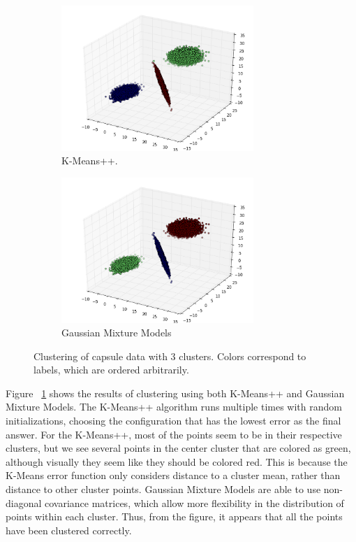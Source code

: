 \documentclass[11pt]{amsart}
\begin{document}
\begin{figure}
	\begin{subfigure}{\textwidth}
		\centering		
		\includegraphics[width=0.8\textwidth]{capsule_k_means_plot.png}
		\caption{K-Means++.}
	\end{subfigure}
	\begin{subfigure}{\textwidth}
		\centering
		\includegraphics[width=0.8\textwidth]{capsule_gauss_plot.png}
		\caption{Gaussian Mixture Models}
	\end{subfigure}
	\caption{Clustering of capsule data with 3 clusters. Colors correspond to labels, which are ordered arbitrarily.}
	\label{fig:clustering}
\end{figure}

Figure ~\ref{fig:clustering} shows the results of clustering using both K-Means++ and Gaussian Mixture Models. 
The K-Means++ algorithm runs multiple times with random initializations, choosing the configuration that has the lowest error as the final answer. For the K-Means++, most of the points seem to be in their respective clusters, but we see several points in the center cluster that are colored as green, although visually they seem like they should be colored red. This is because the K-Means error function only considers distance to a cluster mean, rather than distance to other cluster points. 
Gaussian Mixture Models are able to use non-diagonal covariance matrices, which allow more flexibility in the distribution of points within each cluster. Thus, from the figure, it appears that all the points have been clustered correctly.
\end{document}
